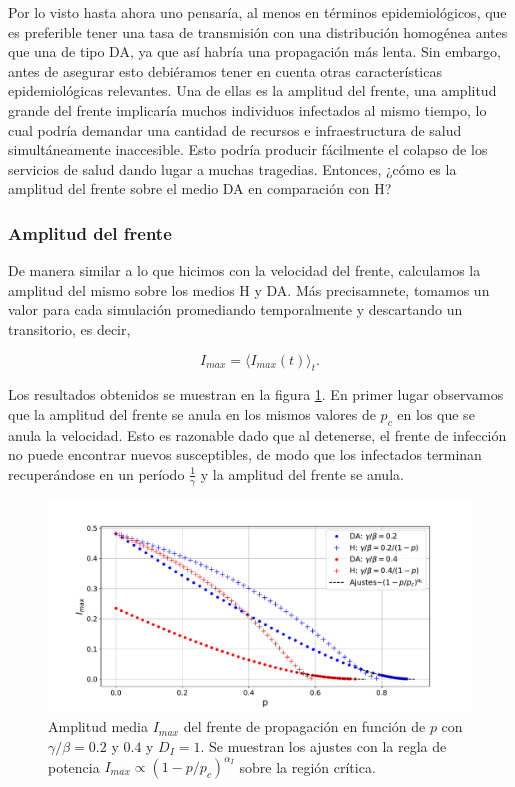 Por lo visto hasta ahora uno pensaría, al menos en términos epidemiológicos, que es preferible tener una tasa de transmisión con una distribución homogénea antes que una de tipo DA, ya que así habría una propagación más lenta. Sin embargo, antes de asegurar esto debiéramos tener en cuenta otras características epidemiológicas relevantes. Una de ellas es la amplitud del frente, una amplitud grande del frente implicaría muchos individuos infectados al mismo tiempo, lo cual podría demandar una cantidad de recursos e infraestructura de salud simultáneamente inaccesible. Esto podría producir fácilmente el colapso de los servicios de salud dando lugar a muchas tragedias. 
Entonces, ¿cómo es la amplitud del frente sobre el medio DA en comparación con H?


\subsubsection*{Amplitud del frente}

De manera similar a lo que hicimos con la velocidad del frente, calculamos la amplitud del mismo sobre los medios H y DA. Más precisamnete, tomamos un valor para cada simulación promediando temporalmente y descartando un transitorio, es decir,

\begin{equation}
    I_{max} = \langle I_{max}(t) \rangle_{t}.
\end{equation}

Los resultados obtenidos se muestran en la figura \ref{fig:amplitud_p}. En primer lugar observamos que la amplitud del frente se anula en los mismos valores de $p_c$ en los que se anula la velocidad. Esto es razonable dado que al detenerse, el frente de infección no puede encontrar nuevos susceptibles, de modo que los infectados terminan recuperándose en un período $\frac{1}{\gamma}$ y la amplitud del frente se anula. 

\begin{figure}[!b]
    \centering
    \includegraphics[width=\imsizeL]{amplitud_p.pdf}
    \caption[Amplitud máxima del frente de infección en función del parámetro de desorden $p$]{Amplitud media $I_{max}$ del frente de propagación en función de $p$ con $\gamma/\beta=0.2$ y $0.4$ y $D_{I}=1$. Se muestran los 
    ajustes con la regla de potencia $I_{max}\propto(1-p/p_c)^{\alpha_I}$ sobre la región crítica.}
    \label{fig:amplitud_p}
 \end{figure}

